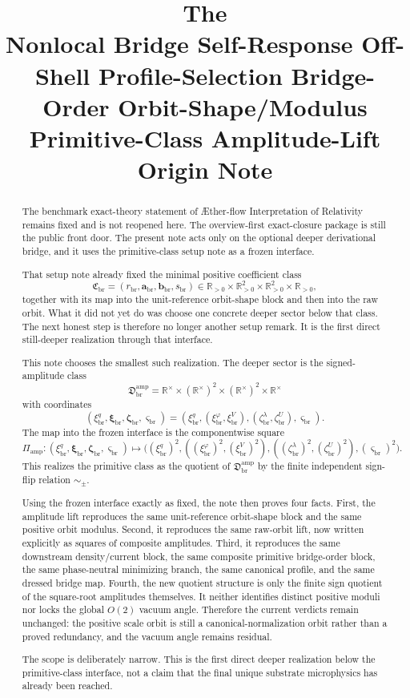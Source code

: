 \documentclass[11pt]{article}
\title{\textbf{The \TheoryName{}}\\[0.4em]
\large Nonlocal Bridge Self-Response Off-Shell Profile-Selection Bridge-Order Orbit-Shape/Modulus Primitive-Class Amplitude-Lift Origin Note}
\author{}
\date{}
\newcommand{\Aflow}{\AE{}ther-flow}
\newcommand{\TheoryName}{\Aflow{} Interpretation of Relativity}
\newcommand{\ScaleMod}{s_{\mathrm{br}}}
\newcommand{\PrimClass}{\mathfrak C_{\mathrm{br}}}
\newcommand{\PrimRead}{r_{\mathrm{br}}}
\newcommand{\PrimKinetic}{\bm a_{\mathrm{br}}}
\newcommand{\PrimAnchor}{\bm b_{\mathrm{br}}}
\newcommand{\DeepSector}{\mathfrak D_{\mathrm{br}}^{\mathrm{amp}}}
\newcommand{\DeepReadAmp}{\xi_{\mathrm{br}}^{q}}
\newcommand{\DeepCovAmp}{\xi_{\mathrm{br}}^{\varphi}}
\newcommand{\DeepRelaxAmp}{\xi_{\mathrm{br}}^{V}}
\newcommand{\DeepKinAmp}{\bm\xi_{\mathrm{br}}}
\newcommand{\DeepWellAmp}{\zeta_{\mathrm{br}}^{\lambda}}
\newcommand{\DeepEqAmp}{\zeta_{\mathrm{br}}^{U}}
\newcommand{\DeepAnchorAmp}{\bm\zeta_{\mathrm{br}}}
\newcommand{\DeepScaleAmp}{\varsigma_{\mathrm{br}}}
\newcommand{\AmpMap}{\Pi_{\mathrm{amp}}}
\newcommand{\SignQuot}{\sim_{\pm}}
\newcommand{\Rstar}{\mathbb R^{\times}}
\begin{document}
\maketitle

\begin{abstract}
The benchmark exact-theory statement of \TheoryName{} remains fixed and is not reopened here. The overview-first exact-closure package is still the public front door. The present note acts only on the optional deeper derivational bridge, and it uses the primitive-class setup note as a frozen interface.

That setup note already fixed the minimal positive coefficient class
\[
\PrimClass=(\PrimRead,\PrimKinetic,\PrimAnchor,\ScaleMod)
\in \mathbb R_{>0}\times\mathbb R_{>0}^2\times\mathbb R_{>0}^2\times\mathbb R_{>0},
\]
together with its map into the unit-reference orbit-shape block and then into the raw orbit. What it did not yet do was choose one concrete deeper sector below that class. The next honest step is therefore no longer another setup remark. It is the first direct still-deeper realization through that interface.

This note chooses the smallest such realization. The deeper sector is the signed-amplitude class
\[
\DeepSector
=
\Rstar\times(\Rstar)^2\times(\Rstar)^2\times\Rstar
\]
with coordinates
\[
(\DeepReadAmp,\DeepKinAmp,\DeepAnchorAmp,\DeepScaleAmp)
=
(\DeepReadAmp,(\DeepCovAmp,\DeepRelaxAmp),(\DeepWellAmp,\DeepEqAmp),\DeepScaleAmp).
\]
The map into the frozen interface is the componentwise square
\[
\AmpMap:
(\DeepReadAmp,\DeepKinAmp,\DeepAnchorAmp,\DeepScaleAmp)
\longmapsto
\bigl(
(\DeepReadAmp)^{2},
((\DeepCovAmp)^{2},(\DeepRelaxAmp)^{2}),
((\DeepWellAmp)^{2},(\DeepEqAmp)^{2}),
(\DeepScaleAmp)^{2}
\bigr).
\]
This realizes the primitive class as the quotient of \(\DeepSector\) by the finite independent sign-flip relation \(\SignQuot\).

Using the frozen interface exactly as fixed, the note then proves four facts. First, the amplitude lift reproduces the same unit-reference orbit-shape block and the same positive orbit modulus. Second, it reproduces the same raw-orbit lift, now written explicitly as squares of composite amplitudes. Third, it reproduces the same downstream density/current block, the same composite primitive bridge-order block, the same phase-neutral minimizing branch, the same canonical profile, and the same dressed bridge map. Fourth, the new quotient structure is only the finite sign quotient of the square-root amplitudes themselves. It neither identifies distinct positive moduli nor locks the global \(O(2)\) vacuum angle. Therefore the current verdicts remain unchanged: the positive scale orbit is still a canonical-normalization orbit rather than a proved redundancy, and the vacuum angle remains residual.

The scope is deliberately narrow. This is the first direct deeper realization below the primitive-class interface, not a claim that the final unique substrate microphysics has already been reached.
\end{abstract}
\end{document}
